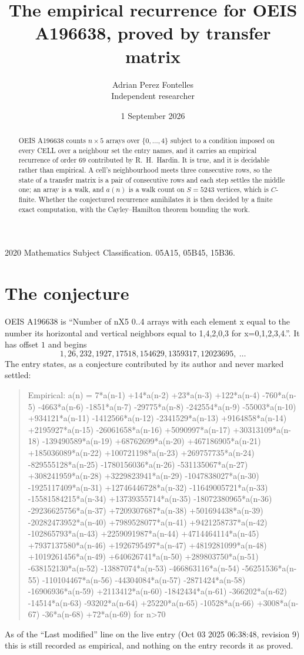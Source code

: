 \documentclass[11pt,a4paper]{article}
\title{The empirical recurrence for OEIS A196638, proved by transfer matrix}
\author{Adrian Perez Fontelles\\ \small Independent researcher}
\date{1 September 2026}
\theoremstyle{plain}
\theoremstyle{definition}
\begin{document}
\maketitle

\begin{abstract}
OEIS A196638 counts $n\times5$ arrays over $\{0,\dots,4\}$ subject to a condition imposed on
every CELL over a neighbour set the entry names, and it carries an empirical recurrence of
order $69$ contributed by R.~H.~Hardin. It is true, and it is decidable rather than
empirical. A cell's neighbourhood meets three consecutive rows, so the state of a transfer
matrix is a pair of consecutive rows and each step settles the middle one; an array is a
walk, and $a(n)$ is a walk count on $S=5243$ vertices, which is $C$-finite. Whether the
conjectured recurrence annihilates it is then decided by a finite exact computation, with the
Cayley--Hamilton theorem bounding the work.
\end{abstract}

\noindent\small 2020 Mathematics Subject Classification. 05A15, 05B45, 15B36.\normalsize

\section{The conjecture}

OEIS A196638 is ``Number of nX5 0..4 arrays with each element x equal to the number its horizontal and vertical neighbors equal to 1,4,2,0,3 for x=0,1,2,3,4.''. It has offset $1$ and begins
\[
1, 26, 232, 1927, 17518, 154629, 1359317, 12023695,\ \dots
\]
The entry states, as a conjecture contributed by its author and never marked settled:
\begin{quote}
Empirical: a(n) = 7*a(n-1) +14*a(n-2) +23*a(n-3) +122*a(n-4) -760*a(n-5) -4663*a(n-6) -1851*a(n-7) -29775*a(n-8) -242554*a(n-9) -55003*a(n-10) +934121*a(n-11) -1412566*a(n-12) -2341529*a(n-13) +9164858*a(n-14) +2195927*a(n-15) -26061658*a(n-16) +5090997*a(n-17) +30313109*a(n-18) -139490589*a(n-19) +68762699*a(n-20) +467186905*a(n-21) +185036089*a(n-22) +100721198*a(n-23) +269757735*a(n-24) -829555128*a(n-25) -1780156036*a(n-26) -531135067*a(n-27) +308241959*a(n-28) +3229823941*a(n-29) -1047838027*a(n-30) -1925117409*a(n-31) +12746446728*a(n-32) -11649005721*a(n-33) -15581584215*a(n-34) +13739355714*a(n-35) -18072380965*a(n-36) -29236625756*a(n-37) +7209307687*a(n-38) +501694438*a(n-39) -20282473952*a(n-40) +7989528077*a(n-41) +9421258737*a(n-42) -102865793*a(n-43) +2259091987*a(n-44) +4714464114*a(n-45) +7937137580*a(n-46) +1926795497*a(n-47) +4819281099*a(n-48) +1019261456*a(n-49) +640626741*a(n-50) +289803750*a(n-51) -638152130*a(n-52) -13887074*a(n-53) -466863116*a(n-54) -56251536*a(n-55) -110104467*a(n-56) -44304084*a(n-57) -2871424*a(n-58) -16906936*a(n-59) +2113412*a(n-60) -1842434*a(n-61) -366202*a(n-62) -14514*a(n-63) -93202*a(n-64) +25220*a(n-65) -10528*a(n-66) +3008*a(n-67) -36*a(n-68) +72*a(n-69) for n>70
\end{quote}
As of the ``Last modified'' line on the live entry (Oct 03 2025 06:38:48, revision 9) this is still
recorded as empirical, and nothing on the entry records it as proved.
\end{document}
